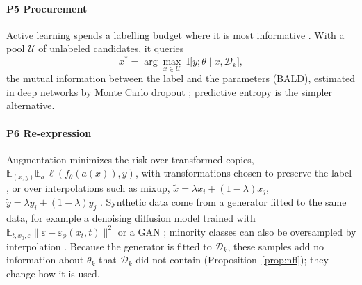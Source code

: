 \documentclass[acmsmall,screen,review]{acmart}
\theoremstyle{acmdefinition}
\begin{document}
\paragraph{P5 Procurement} Active learning spends a labelling budget where it is most informative \cite{settles2009active}. With a pool $\mathcal{U}$ of unlabeled candidates, it queries
\begin{equation}\label{eq:bald}
x^{\ast}=\arg\max_{x\in\mathcal{U}}\;\mathrm{I}\bigl[y;\theta\mid x,\mathcal{D}_k\bigr],
\end{equation}
the mutual information between the label and the parameters (BALD), estimated in deep networks by Monte Carlo dropout \cite{gal2017deep}; predictive entropy is the simpler alternative.

\paragraph{P6 Re-expression} Augmentation minimizes the risk over transformed copies, $\mathbb{E}_{(x,y)}\mathbb{E}_{a}\,\ell(f_\theta(a(x)),y)$, with transformations chosen to preserve the label \cite{shorten2019survey}, or over interpolations such as mixup, $\tilde x=\lambda x_i+(1-\lambda)x_j$, $\tilde y=\lambda y_i+(1-\lambda)y_j$ \cite{zhang2018mixup}. Synthetic data come from a generator fitted to the same data, for example a denoising diffusion model trained with $\mathbb{E}_{t,x_0,\varepsilon}\|\varepsilon-\varepsilon_\phi(x_t,t)\|^2$ \cite{ho2020denoising} or a GAN \cite{goodfellow2014generative}; minority classes can also be oversampled by interpolation \cite{chawla2002smote}. Because the generator is fitted to $\mathcal{D}_k$, these samples add no information about $\theta_k$ that $\mathcal{D}_k$ did not contain (Proposition~\ref{prop:nfl}); they change how it is used.
\end{document}
